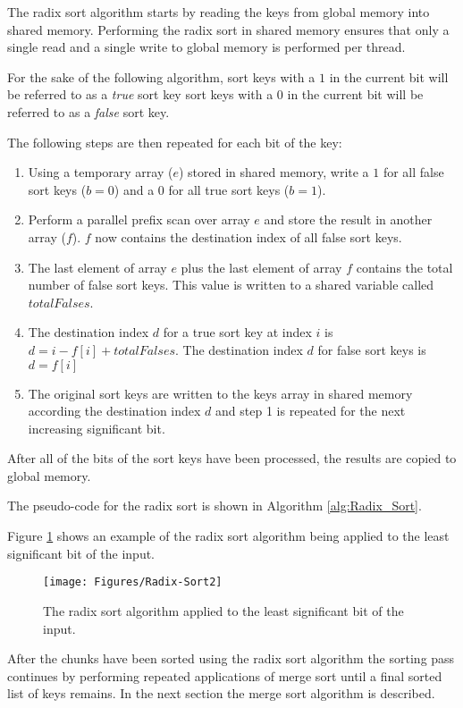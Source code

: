 The radix sort algorithm starts by reading the keys from global memory into shared memory. Performing the radix sort in shared memory ensures that only a single read and a single write to global memory is performed per thread. 

For the sake of the following algorithm, sort keys with a $1$ in the current bit will be referred to as a \emph{true} sort key sort keys with a $0$ in the current bit will be referred to as a \emph{false} sort key.

The following steps are then repeated for each bit of the key:

\begin{enumerate}
\item{Using a temporary array ($e$) stored in shared memory, write a $1$ for all false sort keys ($b=0$) and a $0$ for all true sort keys ($b=1$).}
\item{Perform a parallel prefix scan over array $e$ and store the result in another array ($f$). $f$ now contains the destination index of all false sort keys.}
\item{The last element of array $e$ plus the last element of array $f$ contains the total number of false sort keys. This value is written to a shared variable called $totalFalses$.}
\item{The destination index $d$ for a true sort key at index $i$ is $d=i-f[i]+totalFalses$. The destination index $d$ for false sort keys is $d=f[i]$}
\item{The original sort keys are written to the keys array in shared memory according the destination index $d$ and step 1 is repeated for the next increasing significant bit.}
\end{enumerate}

After all of the bits of the sort keys have been processed, the results are copied to global memory.

The pseudo-code for the radix sort is shown in Algorithm \ref{alg:Radix_Sort}.

Figure \ref{fig:Radix-Sort2} shows an example of the radix sort algorithm being applied to the least significant bit of the input.

\begin{figure}[h]
\centering
\texttt{[image: Figures/Radix-Sort2]}
\decoRule
\caption{The radix sort algorithm applied to the least significant bit of the input.}
\label{fig:Radix-Sort2}
\end{figure}

After the chunks have been sorted using the radix sort algorithm the sorting pass continues by performing repeated applications of merge sort until a final sorted list of keys remains. In the next section the merge sort algorithm is described.

